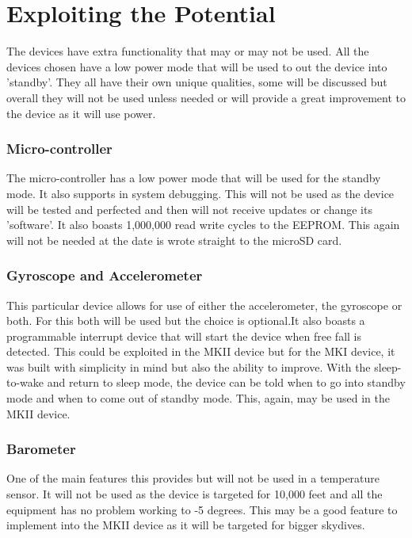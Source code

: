 \documentclass{report}
\begin{document}
\section{Exploiting the Potential}
 
 The devices have extra functionality that may or may not be used. All the devices chosen have a low power mode that will be used to out the device into 'standby'. They all have their own unique qualities, some will be discussed but overall they will not be used unless needed or will provide a great improvement to the device as it will use power.
 
\subsubsection{Micro-controller}
The micro-controller has a low power mode that will be used for the standby mode. It also supports in system debugging. This will not be used as the device will be tested and perfected and then will not receive updates or change its 'software'. It also boasts 1,000,000 read write cycles to the EEPROM. This again will not be needed at the date is wrote straight to the microSD card.

\subsubsection{Gyroscope and Accelerometer}
This particular device allows for use of either the accelerometer, the gyroscope or both. For this both will be used but the choice is optional.It also boasts a programmable interrupt device that will start the device when free fall is detected. This could be exploited in the MKII device but for the MKI device, it was built with simplicity in mind but also the ability to improve. With the sleep-to-wake and return to sleep mode, the device can be told when to go into standby mode and when to come out of standby mode. This, again, may be used in the MKII device. 

\subsubsection{Barometer}
One of the main features this provides but will not be used in a temperature sensor. It will not be used as the device is targeted for 10,000 feet and all the equipment has no problem working to -5 degrees. This may be a good feature to implement into the MKII device as it will be targeted for bigger skydives.
  
\end{document}
